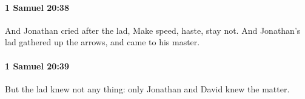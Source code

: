 		\paragraph{1 Samuel 20:38} %
			\label{1SAMUEL-20-38}

			And Jonathan cried after the lad, Make speed, haste, stay not. And Jonathan’s lad gathered up the arrows, and came to his master.


		\paragraph{1 Samuel 20:39} %
			\label{1SAMUEL-20-39}

			But the lad knew not any thing: only Jonathan and David knew the matter.


